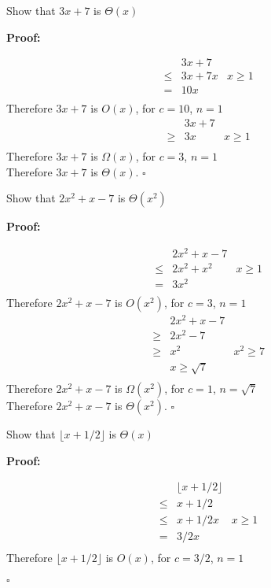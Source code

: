 \documentclass{article}
\newenvironment{proof}
{\color{PineGreen}\begin{list}{}%
         {\setlength{\leftmargin}{1cm}}%
         \item[]%
        \textbf{Proof:}
        
        }
{ $\square$\end{list}}
\begin{document}
\begin{enumerate}[label=\alph{enumi})]
\item Show that $3x + 7$ is $\Theta (x)$
\begin{proof}
\[\begin{array}{rclr}
&&3x+7&\\
&\leq&3x+7x	&	x\geq 1\\
&=&10x & \\
\end{array}\]
Therefore $3x+7$ is $O(x)$, for $c=10$, $n=1$
\[\begin{array}{rclr}
&&3x+7&\\
&\geq&3x	&	x\geq 1\\
\end{array}\]
Therefore $3x+7$ is $\Omega(x)$, for $c=3$, $n=1$\\
Therefore $3x+7$ is $\Theta (x)$.
\end{proof}
\item Show that $2x^2+x-7$ is $\Theta (x^2)$
\begin{proof}
\[\begin{array}{rclr}
&&2x^2+x-7&\\
&\leq&2x^2+x^2	&	x\geq 1\\
&=&3x^2 & \\
\end{array}\]
Therefore $2x^2+x-7$ is $O(x^2)$, for $c=3$, $n=1$
\[\begin{array}{rclr}
&&2x^2+x-7&\\
&\geq&2x^2-7	&	\\
&\geq&x^2		& x^2 \geq 7 \\
&				& x \geq \sqrt{7} \\
\end{array}\]
Therefore $2x^2+x-7$ is $\Omega(x^2)$, for $c=1$, $n=\sqrt{7}$\\
Therefore $2x^2+x-7$ is $\Theta (x^2)$.
\end{proof}
\item Show that $\lfloor x + 1/2 \rfloor$ is $\Theta (x)$
\begin{proof}
\[\begin{array}{rclr}
&&\lfloor x + 1/2 \rfloor&\\
&\leq&x + 1/2	&		\\
&\leq&x + 1/2x	&	x \geq 1	\\
&=&3/2x			& \\
\end{array}\]
Therefore $\lfloor x + 1/2 \rfloor$ is $O(x)$, for $c=3/2$, $n=1$
\[\begin{array}{rclr}

\end{array}\]
\end{proof}
\end{enumerate}
\end{document}
